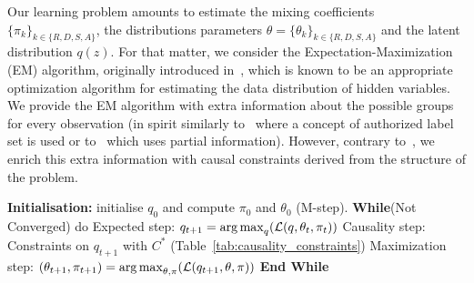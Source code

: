 \label{Causal_EM_theory}
Our learning problem amounts to estimate the mixing coefficients $\{\pi_k\}_{k \in \{R,D,S,A\}}$, the  distributions parameters $\theta=\{\theta_k\}_{k \in \{R,D,S,A\}}$ and the latent distribution $q(z)$. For that matter, we consider the Expectation-Maximization (EM) algorithm, originally introduced in~\cite{Dempster_1977}, which is known to be an appropriate optimization algorithm for estimating the data distribution of hidden variables. %
We provide the EM algorithm with extra information about the possible groups for every observation (in spirit similarly to~\cite{ambroise2000algorithm} where a concept of authorized label set is used or to~\cite{come2009learning} which uses partial information). However, contrary to~\cite{ambroise2000algorithm, come2009learning}, we enrich this extra information with causal constraints derived from the structure of the problem.

\begin{algorithm}[!ht]
\caption{Expectation-Causality-Maximisation}\label{algo:causal_em}
\begin{algorithmic} 
\State \textbf{Initialisation:} initialise $q_0$ and compute $\pi_0$ and $\theta_0$ (M-step).
\State \textbf{While}(Not Converged) do
	\State \hspace{0.5 cm} Expected step:
	$q_{t+1} = \operatorname*{arg \, max}_q(\mathcal{L}(q, \theta_t,\pi_t))$
	\State \hspace{0.5 cm} Causality step:
	Constraints on $q_{t+1}$ with $C^*$ (Table~\ref{tab:causality_constraints})
	\State \hspace{0.5 cm} Maximization step:
	$(\theta_{t+1},\pi_{t+1}) = \operatorname*{arg \, max}_{\theta,\pi}(\mathcal{L}(q_{t+1},\theta,\pi))$
\State \textbf{End While}
\end{algorithmic}
\end{algorithm}

